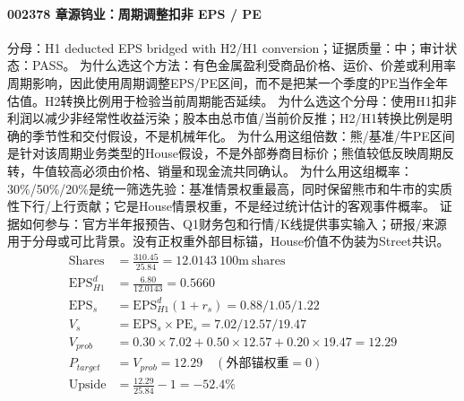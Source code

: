 \paragraph{002378 章源钨业：周期调整扣非 EPS / PE}
分母：H1 deducted EPS bridged with H2/H1 conversion；证据质量：中；审计状态：PASS。
为什么选这个方法：有色金属盈利受商品价格、运价、价差或利用率周期影响，因此使用周期调整EPS/PE区间，而不是把某一个季度的PE当作全年估值。H2转换比例用于检验当前周期能否延续。
为什么选这个分母：使用H1扣非利润以减少非经常性收益污染；股本由总市值/当前价反推；H2/H1转换比例是明确的季节性和交付假设，不是机械年化。
为什么用这组倍数：熊/基准/牛PE区间是针对该周期业务类型的House假设，不是外部券商目标价；熊值较低反映周期反转，牛值较高必须由价格、销量和现金流共同确认。
为什么用这组概率：30\%/50\%/20\%是统一筛选先验：基准情景权重最高，同时保留熊市和牛市的实质性下行/上行贡献；它是House情景权重，不是经过统计估计的客观事件概率。
证据如何参与：官方半年报预告、Q1财务包和行情/K线提供事实输入；研报/来源用于分母或可比背景。没有正权重外部目标锚，House价值不伪装为Street共识。
\begin{align*}
\mathrm{Shares} &= \frac{310.45}{25.84}=12.0143\ \mathrm{100m\ shares}\\
\mathrm{EPS}_{H1}^d &= \frac{6.80}{12.0143}=0.5660\\
\mathrm{EPS}_s &= \mathrm{EPS}_{H1}^d(1+r_s)=0.88/1.05/1.22\\
V_s &= \mathrm{EPS}_s\times \mathrm{PE}_s=7.02/12.57/19.47\\
V_{prob} &= 0.30\times 7.02+0.50\times 12.57+0.20\times 19.47=12.29\\
P_{target} &= V_{prob}=12.29\quad(\text{外部锚权重}=0)\\
\mathrm{Upside} &= \frac{12.29}{25.84}-1=-52.4\%\\
\end{align*}

